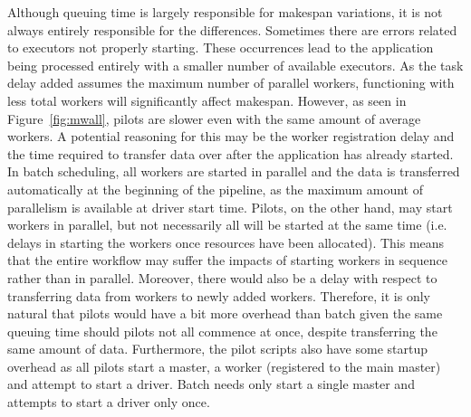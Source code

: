     Although queuing time is largely responsible for makespan variations, it is not
    always entirely responsible for the differences. Sometimes there are errors related
    to executors not properly starting. These occurrences lead to the 
    application being processed entirely with a smaller number of available executors. As the task
    delay added assumes the maximum number of parallel workers, functioning with less total workers
    will significantly affect makespan. However, as seen in Figure~\ref{fig:mwall},
    pilots are slower even with the same amount of average workers. A potential reasoning for this
    may be the worker registration delay and the time required to transfer data
    over after the application has already started. In batch scheduling, all workers are started in
    parallel and the data is transferred automatically at the beginning of the pipeline, as the maximum amount
    of parallelism is available at driver start time. Pilots, on the other hand, may start workers in parallel,
    but not necessarily all will be started at the same time (i.e. delays in starting the workers once resources
    have been allocated). This means that the entire 
    workflow may suffer the impacts of starting workers in sequence rather than in parallel. Moreover, there would also
    be a delay with respect to transferring data from workers to newly added workers. Therefore,
    it is only natural that pilots would have a bit more overhead than batch given the same
    queuing time should pilots not all commence at once, despite transferring the same amount of data.
     Furthermore, the pilot scripts also
    have some startup overhead as all pilots start a master, a worker (registered to the main
    master) and attempt to start a driver. Batch needs only start a single master and attempts to start
    a driver only once.
    
